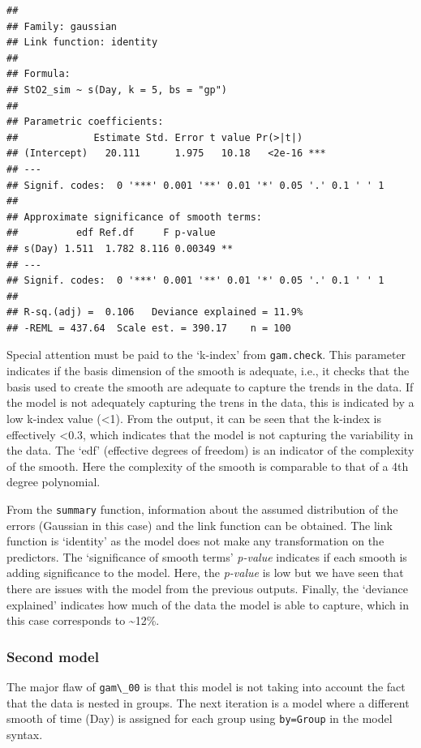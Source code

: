 \documentclass[
]{article}
\newcommand{\passthrough}[1]{#1}
\begin{document}
\begin{lstlisting}
## 
## Family: gaussian 
## Link function: identity 
## 
## Formula:
## StO2_sim ~ s(Day, k = 5, bs = "gp")
## 
## Parametric coefficients:
##             Estimate Std. Error t value Pr(>|t|)    
## (Intercept)   20.111      1.975   10.18   <2e-16 ***
## ---
## Signif. codes:  0 '***' 0.001 '**' 0.01 '*' 0.05 '.' 0.1 ' ' 1
## 
## Approximate significance of smooth terms:
##          edf Ref.df     F p-value   
## s(Day) 1.511  1.782 8.116 0.00349 **
## ---
## Signif. codes:  0 '***' 0.001 '**' 0.01 '*' 0.05 '.' 0.1 ' ' 1
## 
## R-sq.(adj) =  0.106   Deviance explained = 11.9%
## -REML = 437.64  Scale est. = 390.17    n = 100
\end{lstlisting}

Special attention must be paid to the `k-index' from \passthrough{\lstinline!gam.check!}. This parameter indicates if the basis dimension of the smooth is adequate, i.e., it checks that the basis used to create the smooth are adequate to capture the trends in the data. If the model is not adequately capturing the trens in the data, this is indicated by a low k-index value (\textless{}1). From the output, it can be seen that the k-index is effectively \textless{}0.3, which indicates that the model is not capturing the variability in the data. The `edf' (effective degrees of freedom) is an indicator of the complexity of the smooth. Here the complexity of the smooth is comparable to that of a 4th degree polynomial.

From the \passthrough{\lstinline!summary!} function, information about the assumed distribution of the errors (Gaussian in this case) and the link function can be obtained. The link function is `identity' as the model does not make any transformation on the predictors. The `significance of smooth terms' \emph{p-value} indicates if each smooth is adding significance to the model. Here, the \emph{p-value} is low but we have seen that there are issues with the model from the previous outputs. Finally, the `deviance explained' indicates how much of the data the model is able to capture, which in this case corresponds to \textasciitilde{}12\%.

\hypertarget{second-model}{%
\subsubsection{Second model}\label{second-model}}

The major flaw of \passthrough{\lstinline!gam\_00!} is that this model is not taking into account the fact that the data is nested in groups. The next iteration is a model where a different smooth of time (Day) is assigned for each group using \passthrough{\lstinline!by=Group!} in the model syntax.
\end{document}
